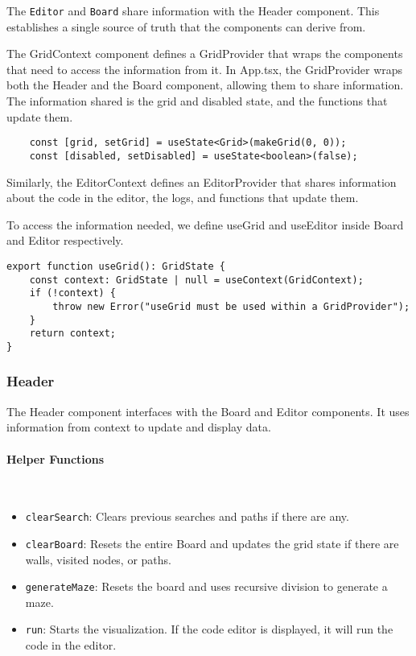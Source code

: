 The \texttt{Editor} and \texttt{Board} share information with the Header component. This establishes a single source of truth that the components can derive from.

The GridContext component defines a GridProvider that wraps the components that need to access the information from it. In App.tsx, the GridProvider wraps both the Header and the Board component, allowing them to share information.
The information shared is the grid and disabled state, and the functions that update them.

\begin{verbatim}
    const [grid, setGrid] = useState<Grid>(makeGrid(0, 0));
    const [disabled, setDisabled] = useState<boolean>(false);
\end{verbatim}

Similarly, the EditorContext defines an EditorProvider that shares information about the code in the editor, the logs, and functions that update them.

To access the information needed, we define useGrid and useEditor inside Board and Editor respectively.

\begin{verbatim}
export function useGrid(): GridState {
    const context: GridState | null = useContext(GridContext);
    if (!context) {
        throw new Error("useGrid must be used within a GridProvider");
    }
    return context;
}
\end{verbatim}

\subsubsection{Header}

The Header component interfaces with the Board and Editor components. It uses information from context to update and display data.

\paragraph{Helper Functions} \

\begin{itemize}
    \item \texttt{clearSearch}: Clears previous searches and paths if there are any.
    \item \texttt{clearBoard}: Resets the entire Board and updates the grid state if there are walls, visited nodes, or paths.
    \item \texttt{generateMaze}: Resets the board and uses recursive division to generate a maze.
    \item \texttt{run}: Starts the visualization. If the code editor is displayed, it will run the code in the editor.
\end{itemize}

